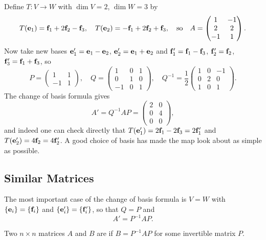 \documentclass[a4paper]{scrartcl}
\begin{document}
\begin{example}
	Define $T: V \rightarrow W$ with $\dim V = 2$, $\dim W = 3$ by
	$$
	T(\mathbf{e}_1) = \mathbf{f}_1 + 2\mathbf{f}_2 - \mathbf{f}_3, \quad
	T(\mathbf{e}_2) = -\mathbf{f}_1 + 2\mathbf{f}_2 + \mathbf{f}_3,
	\quad \text{so} \quad
	A = \begin{pmatrix}
		1 & -1 \\ 2 & 2 \\ -1 & 1
	\end{pmatrix}.
	$$
	Now take new bases $\mathbf{e}_1' = \mathbf{e}_1 - \mathbf{e}_2$, $\mathbf{e}_2' = \mathbf{e}_1 + \mathbf{e}_2$ and $\mathbf{f}_1' = \mathbf{f}_1 - \mathbf{f}_3$, $\mathbf{f}_2' = \mathbf{f}_2$, $\mathbf{f}_3' = \mathbf{f}_1 + \mathbf{f}_3$, so
	$$
	P = \begin{pmatrix}
		1 & 1 \\ -1 & 1
	\end{pmatrix}, \quad
	Q = \begin{pmatrix}
		1 & 0 & 1 \\
		0 & 1 & 0 \\
		-1 & 0 & 1
	\end{pmatrix}, \quad
	Q^{-1} = \frac{1}{2}\begin{pmatrix}
		1 & 0 & -1 \\
		0 & 2 & 0 \\
		1 & 0 & 1
	\end{pmatrix}.
	$$
	The change of basis formula gives
	$$
	A' = Q^{-1}AP = \begin{pmatrix}
		2 & 0 \\ 0 & 4 \\ 0 & 0
	\end{pmatrix},
	$$
	and indeed one can check directly that $T(\mathbf{e}_1') = 2\mathbf{f}_1 - 2\mathbf{f}_3 = 2 \mathbf{f}_1'$ and $T(\mathbf{e}_2') = 4\mathbf{f}_2 = 4\mathbf{f}_2'$. A good choice of basis has made the map look about as simple as possible.
\end{example}

\subsection{Similar Matrices}

The most important case of the change of basis formula is $V = W$ with $\{\mathbf{e}_i\} = \{\mathbf{f}_i\}$ and $\{\mathbf{e}'_i\} = \{\mathbf{f}'_i\}$, so that $Q = P$ and
$$
A' = P^{-1}AP.
$$

\begin{definition}
	Two $n \times n$ matrices $A$ and $B$ are  if $B = P^{-1}AP$ for some invertible matrix $P$.
\end{definition}
\end{document}
